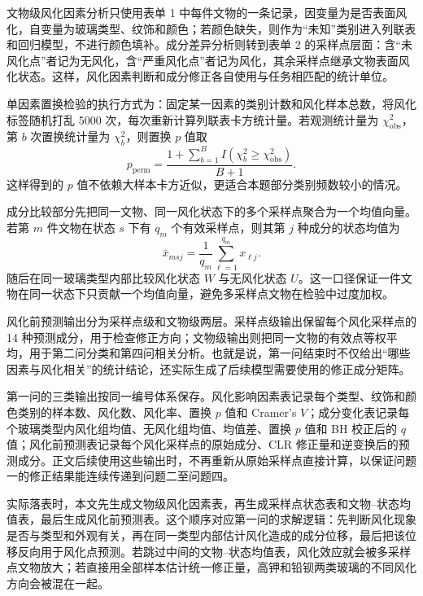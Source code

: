 \documentclass[UTF8,zihao=-4,a4paper,fontset=fandol]{ctexart}
\begin{document}
文物级风化因素分析只使用表单 1 中每件文物的一条记录，因变量为是否表面风化，自变量为玻璃类型、纹饰和颜色；若颜色缺失，则作为“未知”类别进入列联表和回归模型，不进行颜色填补。成分差异分析则转到表单 2 的采样点层面：含“未风化点”者记为无风化，含“严重风化点”者记为风化，其余采样点继承文物表面风化状态。这样，风化因素判断和成分修正各自使用与任务相匹配的统计单位。

单因素置换检验的执行方式为：固定某一因素的类别计数和风化样本总数，将风化标签随机打乱 5000 次，每次重新计算列联表卡方统计量。若观测统计量为 $\chi^2_{\mathrm{obs}}$，第 $b$ 次置换统计量为 $\chi^2_b$，则置换 $p$ 值取
\begin{equation}
  p_{\mathrm{perm}}=\frac{1+\sum_{b=1}^{B}I(\chi^2_b\ge \chi^2_{\mathrm{obs}})}{B+1}.
  \label{eq:perm-p}
\end{equation}
这样得到的 $p$ 值不依赖大样本卡方近似，更适合本题部分类别频数较小的情况。

成分比较部分先把同一文物、同一风化状态下的多个采样点聚合为一个均值向量。若第 $m$ 件文物在状态 $s$ 下有 $q_m$ 个有效采样点，则其第 $j$ 种成分的状态均值为
\begin{equation}
  \bar x_{msj}=\frac{1}{q_m}\sum_{\ell=1}^{q_m}x_{\ell j}.
  \label{eq:state-mean}
\end{equation}
随后在同一玻璃类型内部比较风化状态 $W$ 与无风化状态 $U$。这一口径保证一件文物在同一状态下只贡献一个均值向量，避免多采样点文物在检验中过度加权。

风化前预测输出分为采样点级和文物级两层。采样点级输出保留每个风化采样点的 14 种预测成分，用于检查修正方向；文物级输出则把同一文物的有效点等权平均，用于第二问分类和第四问相关分析。也就是说，第一问结束时不仅给出“哪些因素与风化相关”的统计结论，还实际生成了后续模型需要使用的修正成分矩阵。

第一问的三类输出按同一编号体系保存。风化影响因素表记录每个类型、纹饰和颜色类别的样本数、风化数、风化率、置换 $p$ 值和 Cramer's $V$；成分变化表记录每个玻璃类型内风化组均值、无风化组均值、均值差、置换 $p$ 值和 BH 校正后的 $q$ 值；风化前预测表记录每个风化采样点的原始成分、CLR 修正量和逆变换后的预测成分。正文后续使用这些输出时，不再重新从原始采样点直接计算，以保证问题一的修正结果能连续传递到问题二至问题四。

实际落表时，本文先生成文物级风化因素表，再生成采样点状态表和文物--状态均值表，最后生成风化前预测表。这个顺序对应第一问的求解逻辑：先判断风化现象是否与类型和外观有关，再在同一类型内部估计风化造成的成分位移，最后把该位移反向用于风化点预测。若跳过中间的文物--状态均值表，风化效应就会被多采样点文物放大；若直接用全部样本估计统一修正量，高钾和铅钡两类玻璃的不同风化方向会被混在一起。
\end{document}
